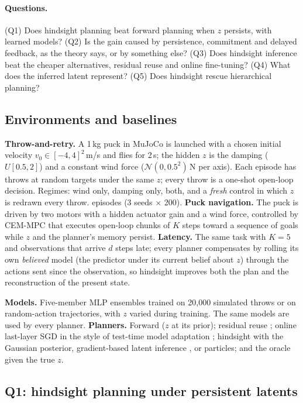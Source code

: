 \documentclass[11pt]{article}
\begin{document}
\paragraph{Questions.} (Q1) Does hindsight planning beat forward planning when $z$ persists, with learned models? (Q2)
Is the gain caused by persistence, commitment and delayed feedback, as the theory says, or by something else? (Q3) Does
hindsight inference beat the cheaper alternatives, residual reuse and online fine-tuning? (Q4) What does the inferred
latent represent? (Q5) Does hindsight rescue hierarchical planning?

\subsection{Environments and baselines}
\textbf{Throw-and-retry.} A 1\,kg puck in MuJoCo \citep{todorov2012mujoco} is launched with a chosen initial velocity
$v_0\in[-4,4]^2$\,m/s and flies for 2\,s; the hidden $z$ is the damping ($U[0.5,2]$) and a constant wind force
($\mathcal N(0,0.5^2)$\,N per axis). Each episode has \twAttempts{} throws at random targets under the same $z$; every
throw is a one-shot open-loop decision. Regimes: wind only, damping only, both, and a \emph{fresh} control in which $z$
is redrawn every throw. \twEpisodes{} episodes (3 seeds $\times$ 200).
\textbf{Puck navigation.} The puck is driven by two motors with a hidden actuator gain and a wind force, controlled by
CEM-MPC that executes open-loop chunks of $K$ steps toward a sequence of goals while $z$ and the planner's memory persist.
\textbf{Latency.} The same task with $K=5$ and observations that arrive $d$ steps late; every planner compensates by
rolling its own \emph{believed} model (the predictor under its current belief about $z$) through the actions sent since
the observation, so hindsight improves both the plan and the reconstruction of the present state.

\textbf{Models.} Five-member MLP ensembles trained on 20,000 simulated throws or on random-action trajectories, with $z$
varied during training. The same models are used by every planner. \textbf{Planners.} Forward ($z$ at its prior);
residual reuse \citep{cwm_2611_24778}; online last-layer SGD in the style of test-time model adaptation
\citep{adajepa_2606_32026}; hindsight with the Gaussian posterior, gradient-based latent inference
\citep{t2z_2610_22364}, or particles; and the oracle given the true $z$.

\subsection{Q1: hindsight planning under persistent latents}
\end{document}
